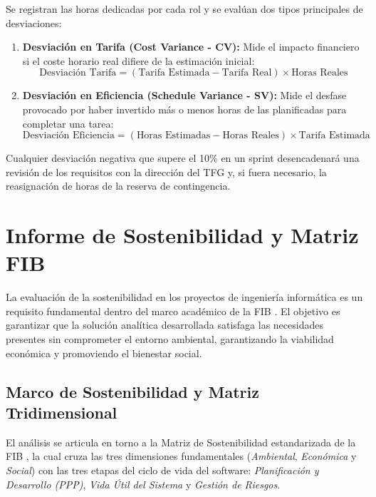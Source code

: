 \documentclass[12pt, a4paper, twoside]{report}
\begin{document}
Se registran las horas dedicadas por cada rol y se evalúan dos tipos principales de desviaciones:
\begin{enumerate}
    \item \textbf{Desviación en Tarifa (Cost Variance - CV):} Mide el impacto financiero si el coste horario real difiere de la estimación inicial:
    \begin{equation}
    \text{Desviación Tarifa} = (\text{Tarifa Estimada} - \text{Tarifa Real}) \times \text{Horas Reales}
    \end{equation}
    \item \textbf{Desviación en Eficiencia (Schedule Variance - SV):} Mide el desfase provocado por haber invertido más o menos horas de las planificadas para completar una tarea:
    \begin{equation}
    \text{Desviación Eficiencia} = (\text{Horas Estimadas} - \text{Horas Reales}) \times \text{Tarifa Estimada}
    \end{equation}
\end{enumerate}

Cualquier desviación negativa que supere el 10\% en un sprint desencadenará una revisión de los requisitos con la dirección del TFG y, si fuera necesario, la reasignación de horas de la reserva de contingencia.



\chapter{Informe de Sostenibilidad y Matriz FIB}

La evaluación de la sostenibilidad en los proyectos de ingeniería informática es un requisito fundamental dentro del marco académico de la FIB \cite{fib_sostenibilitat}. El objetivo es garantizar que la solución analítica desarrollada satisfaga las necesidades presentes sin comprometer el entorno ambiental, garantizando la viabilidad económica y promoviendo el bienestar social.

\section{Marco de Sostenibilidad y Matriz Tridimensional}
El análisis se articula en torno a la Matriz de Sostenibilidad estandarizada de la FIB \cite{fib_sostenibilitat}, la cual cruza las tres dimensiones fundamentales (\textit{Ambiental}, \textit{Económica} y \textit{Social}) con las tres etapas del ciclo de vida del software: \textit{Planificación y Desarrollo (PPP)}, \textit{Vida Útil del Sistema} y \textit{Gestión de Riesgos}.
\end{document}
